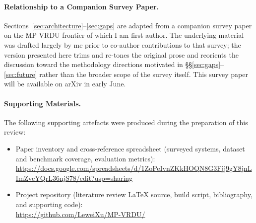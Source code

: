 \documentclass[11pt]{article}
\begin{document}
\paragraph{Relationship to a Companion Survey Paper.}
Sections~\ref{sec:architecture}--\ref{sec:gaps} are adapted from a companion survey paper on the MP-VRDU frontier of which I am first author. The underlying material was drafted largely by me prior to co-author contributions to that survey; the version presented here trims and re-tones the original prose and reorients the discussion toward the methodology directions motivated in \S\S\ref{sec:gaps}--\ref{sec:future} rather than the broader scope of the survey itself. This survey paper will be available on arXiv in early June.

\paragraph{Supporting Materials.}
The following supporting artefacts were produced during the preparation of this review:
\begin{itemize}
  \item Paper inventory and cross-reference spreadsheet (surveyed systems, dataset and benchmark coverage, evaluation metrics): \\ \url{https://docs.google.com/spreadsheets/d/1ZoPeIvnZKkHOQN8G3Fjj9gY8jnLImZvcYQrL36njS78/edit?usp=sharing}
  \item Project repository (literature review \LaTeX{} source, build script, bibliography, and supporting code): \\ \url{https://github.com/LeweiXu/MP-VRDU/}
\end{itemize}






\appendix
\end{document}
